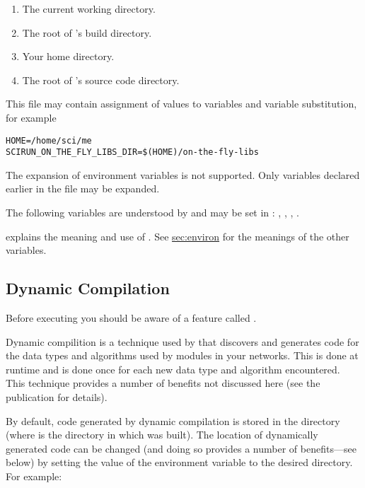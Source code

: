 \begin{enumerate}
\item The current working directory.
\item The root of \sr's build directory.
\item Your home directory.
\item The root of \sr's source code directory.
\end{enumerate}

This file may contain assignment of values to variables and variable
substitution, for example

\begin{verbatim}
HOME=/home/sci/me
SCIRUN_ON_THE_FLY_LIBS_DIR=$(HOME)/on-the-fly-libs
\end{verbatim}

The expansion of environment variables is not supported.  Only
variables declared earlier in the file may be expanded.

The following variables are understood by \sr{} and may be set in
: ,
, ,
.

 explains the meaning and use
of .  See \hyperref{the
  previous section}{Section~}{}{sec:environ}
for the meanings of the other variables.

\subsection{Dynamic Compilation}
\label{sec:dyncomp}

Before executing \sr{} you should be aware of a feature called
.

Dynamic compilition is a technique used by \sr{} that discovers and
generates code for the data types and algorithms used by modules in
your networks.  This is done at runtime and is done once for each new
data type and algorithm encountered.  This technique provides a number
of benefits not discussed here (see the publication 
for details).

By default, code generated by dynamic compilation is stored in the
directory  (where
 is the directory in which \sr{} was built).  The
location of dynamically generated code can be changed (and doing so
provides a number of benefits---see below) by setting the value of the
environment variable  to the
desired directory. For example:

